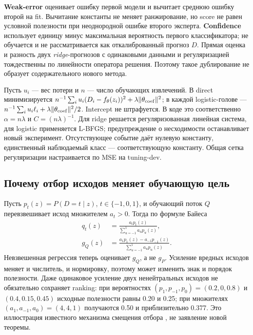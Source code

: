 \textbf{Weak-error} оценивает ошибку первой модели и вычитает среднюю
ошибку второй на fit. Вычитание константы не меняет ранжирование,
но score не равен условной полезности при неоднородной ошибке второго
эксперта. \textbf{Confidence} использует единицу минус максимальная
вероятность первого классификатора; не обучается и не рассматривается
как откалиброванный прогноз $D$.
Прямая оценка и разность двух \emph{ridge}-прогнозов с одинаковыми
данными и регуляризацией тождественны по линейности оператора решения.
Поэтому такое дублирование не образует содержательного нового метода.

Пусть $u_i$ --- вес потери и $n$ --- число обучающих извлечений.
В direct минимизируется $n^{-1}\sum_i u_i(D_i-f_\theta(z_i))^2+
\lambda\|\theta_{\rm coef}\|^2$; в каждой logistic-голове ---
$n^{-1}\sum_i u_i\ell_i+\lambda\|\theta_{\rm coef}\|^2/2$.
Intercept не штрафуется. В коде это соответственно
$\alpha=n\lambda$ и $C=(n\lambda)^{-1}$.
Для ridge решается регуляризованная линейная система,
для logistic применяется L-BFGS; предупреждение о несходимости
останавливает новый эксперимент. Отсутствующее событие даёт нулевую
константу, единственный наблюдаемый класс --- соответствующую константу.
Общая сетка регуляризации настраивается по MSE на tuning-dev.

\subsection{Почему отбор исходов меняет обучающую цель}
Пусть $p_t(z)=P(D=t\mid z)$, $t\in\{-1,0,1\}$,
и обучающий поток $Q$ перевзвешивает исход множителем $a_t>0$.
Тогда по формуле Байеса
\begin{equation}\label{eq:selection_shift}
\begin{aligned}
q_t(z)&=\frac{a_t p_t(z)}{\sum_{u=-1}^{1}a_u p_u(z)},\\
g_Q(z)&=\frac{a_1p_1(z)-a_{-1}p_{-1}(z)}{\sum_{u=-1}^{1}a_u p_u(z)}.
\end{aligned}
\end{equation}
Невзвешенная регрессия теперь оценивает $g_Q$, а не $g_P$.
Усиление вредных исходов меняет и числитель, и нормировку,
поэтому может изменить знак и порядок полезности.
Даже одинаковое усиление двух ненейтральных исходов не обязательно
сохраняет ranking: при вероятностях $(p_1,p_{-1},p_0)=(0.2,0,0.8)$
и $(0.4,0.15,0.45)$ исходные полезности равны 0.20 и 0.25;
при множителях $(a_1,a_{-1},a_0)=(4,4,1)$ получаются
0.50 и приблизительно 0.377. Это иллюстрация известного механизма
смещения отбора \citep{nyberg2023exploring}, не заявление новой теоремы.

